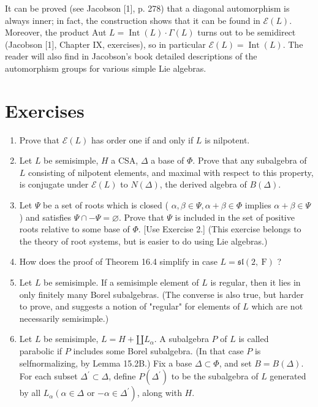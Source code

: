 \documentclass[10pt]{article}
\begin{document}
It can be proved (see Jacobson [1], p. 278) that a diagonal automorphism is always inner; in fact, the construction shows that it can be found in $\mathscr{E}(L)$. Moreover, the product Aut $L=\operatorname{Int}(L) \cdot \Gamma(L)$ turns out to be semidirect (Jacobson [1], Chapter IX, exercises), so in particular $\mathscr{E}(L)=\operatorname{Int}(L)$. The reader will also find in Jacobson's book detailed descriptions of the automorphism groups for various simple Lie algebras.

\section*{Exercises}
\begin{enumerate}
  \item Prove that $\mathscr{E}(L)$ has order one if and only if $L$ is nilpotent.
  \item Let $L$ be semisimple, $H$ a CSA, $\Delta$ a base of $\Phi$. Prove that any subalgebra of $L$ consisting of nilpotent elements, and maximal with respect to this property, is conjugate under $\mathscr{E}(L)$ to $N(\Delta)$, the derived algebra of $B(\Delta)$.
  \item Let $\Psi$ be a set of roots which is closed ( $\alpha, \beta \in \Psi, \alpha+\beta \in \Phi$ implies $\alpha+\beta \in \Psi$ ) and satisfies $\Psi \cap-\Psi=\varnothing$. Prove that $\Psi$ is included in the set of positive roots relative to some base of $\Phi$. [Use Exercise 2.] (This exercise belongs to the theory of root systems, but is easier to do using Lie algebras.)
  \item How does the proof of Theorem 16.4 simplify in case $L=\mathfrak{s l}(2, \mathrm{~F})$ ?
  \item Let $L$ be semisimple. If a semisimple element of $L$ is regular, then it lies in only finitely many Borel subalgebras. (The converse is also true, but harder to prove, and suggests a notion of "regular" for elements of $L$ which are not necessarily semisimple.)
  \item Let $L$ be semisimple, $L=H+\amalg L_{\alpha}$. A subalgebra $P$ of $L$ is called\\
parabolic if $P$ includes some Borel subalgebra. (In that case $P$ is selfnormalizing, by Lemma 15.2B.) Fix a base $\Delta \subset \Phi$, and set $B=B(\Delta)$. For each subset $\Delta^{\prime} \subset \Delta$, define $P\left(\Delta^{\prime}\right)$ to be the subalgebra of $L$ generated by all $L_{\alpha}\left(\alpha \in \Delta\right.$ or $\left.-\alpha \in \Delta^{\prime}\right)$, along with $H$.\\

\end{enumerate}
\end{document}
